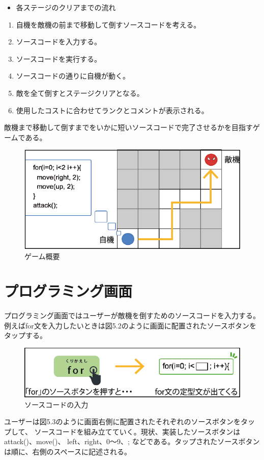 \documentclass[openany,11pt,papersize]{jsbook}
\begin{document}
\begin{itemize}
\item 各ステージのクリアまでの流れ
\end{itemize}
\begin{enumerate}
\item 自機を敵機の前まで移動して倒すソースコードを考える。
\item ソースコードを入力する。
\item ソースコードを実行する。
\item ソースコードの通りに自機が動く。
\item 敵を全て倒すとステージクリアとなる。
\item 使用したコストに合わせてランクとコメントが表示される。
\end{enumerate}
\par 敵機まで移動して倒すまでをいかに短いソースコードで完了させるかを目指すゲームである。

\begin{figure}[h]
\begin{center}
\includegraphics[width=12cm, bb=0 0 573 263]{img/4thParagraph/game.png}
\end{center}
\caption{ゲーム概要}
\end{figure}


\section{プログラミング画面}
プログラミング画面ではユーザーが敵機を倒すためのソースコードを入力する。
例えばfor文を入力したいときは図5.2のように画面に配置されたソースボタンをタップする。

\begin{figure}[H]
\begin{center}
\includegraphics[width=12cm, bb=0 0 564 129]{img/4thParagraph/forButton.png}
\end{center}
\caption{ソースコードの入力}
\end{figure}
ユーザーは図5.3のように画面右側に配置されたそれぞれのソースボタンをタップして、
ソースコードを組み立てていく。現状、実装したソースボタンはattack()、move()、
left、right、0〜9、;  などである。タップされたソースボタンは順に、右側のスペースに記述される。
\end{document}
